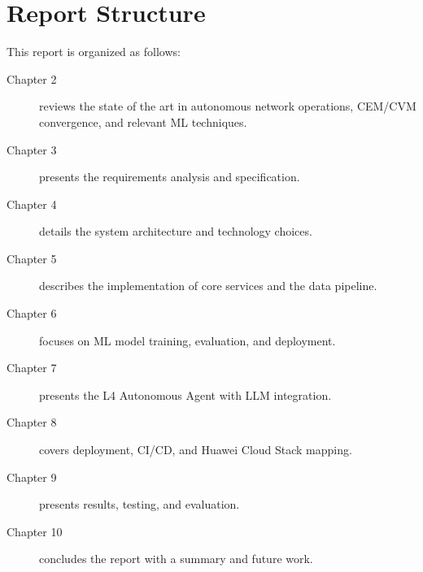 \section{Report Structure}

This report is organized as follows:

\begin{description}
    \item[Chapter 2] reviews the state of the art in autonomous network operations, CEM/CVM convergence, and relevant ML techniques.
    \item[Chapter 3] presents the requirements analysis and specification.
    \item[Chapter 4] details the system architecture and technology choices.
    \item[Chapter 5] describes the implementation of core services and the data pipeline.
    \item[Chapter 6] focuses on ML model training, evaluation, and deployment.
    \item[Chapter 7] presents the L4 Autonomous Agent with LLM integration.
    \item[Chapter 8] covers deployment, CI/CD, and Huawei Cloud Stack mapping.
    \item[Chapter 9] presents results, testing, and evaluation.
    \item[Chapter 10] concludes the report with a summary and future work.
\end{description}

